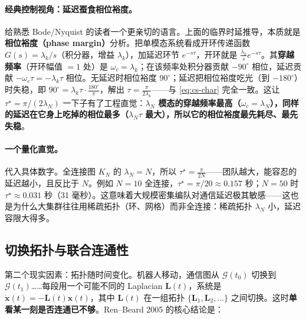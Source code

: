 \paragraph{经典控制视角：延迟蚕食相位裕度。}
给熟悉 Bode/Nyquist 的读者一个更亲切的语言。上面的临界时延推导，本质就是\textbf{相位裕度（phase margin）}分析。把单模态系统看成开环传递函数 $G(s)=\lambda_k/s$（积分器，增益 $\lambda_k$），加延迟环节 $e^{-s\tau}$，开环就是 $\tfrac{\lambda_k}{s}e^{-s\tau}$。其\textbf{穿越频率}（开环幅值 $=1$ 处）是 $\omega_c=\lambda_k$；在该频率处积分器贡献 $-90^\circ$ 相位，延迟贡献 $-\omega_c\tau=-\lambda_k\tau$ 相位。无延迟时相位裕度 $90^\circ$；延迟把相位裕度吃光（到 $-180^\circ$）时失稳，即 $90^\circ=\lambda_k\tau\cdot\tfrac{180^\circ}{\pi}$，解出 $\tau=\tfrac{\pi}{2\lambda_k}$——与 \cref{eq:cs-char} 完全一致。这让 $\tau^\star=\pi/(2\lambda_N)$ 一下子有了工程直觉：\textbf{$\lambda_N$ 模态的穿越频率最高（$\omega_c=\lambda_N$），同样的延迟在它身上吃掉的相位最多（$\lambda_N\tau$ 最大），所以它的相位裕度最先耗尽、最先失稳}。

\paragraph{一个量化直觉。}
代入具体数字。全连接图 $K_N$ 的 $\lambda_N=N$，所以 $\tau^\star=\tfrac{\pi}{2N}$——团队越大，能容忍的延迟越小，且反比于 $N$。例如 $N=10$ 全连接，$\tau^\star=\pi/20\approx0.157$ 秒；$N=50$ 时 $\tau^\star\approx0.031$ 秒（31 毫秒）。这意味着大规模密集编队对通信延迟极其敏感——这也是为什么大集群往往用稀疏拓扑（环、网格）而非全连接：稀疏拓扑 $\lambda_N$ 小，延迟容限大得多。

\subsection{切换拓扑与联合连通性}
\label{sec:cs-switching}

第二个现实因素：拓扑随时间变化。机器人移动，通信图从 $\mathcal{G}(t_0)$ 切换到 $\mathcal{G}(t_1)$……每段用一个可能不同的 Laplacian $\mathbf{L}(t)$，系统是 $\dot{\mathbf{x}}(t)=-\mathbf{L}(t)\mathbf{x}(t)$，其中 $\mathbf{L}(t)$ 在一组拓扑 $\{\mathbf{L}_1,\mathbf{L}_2,\dots\}$ 之间切换。这时\textbf{单看某一刻是否连通已不够}。Ren--Beard 2005 的核心结论是\cite{renbeard2005consensus}：

